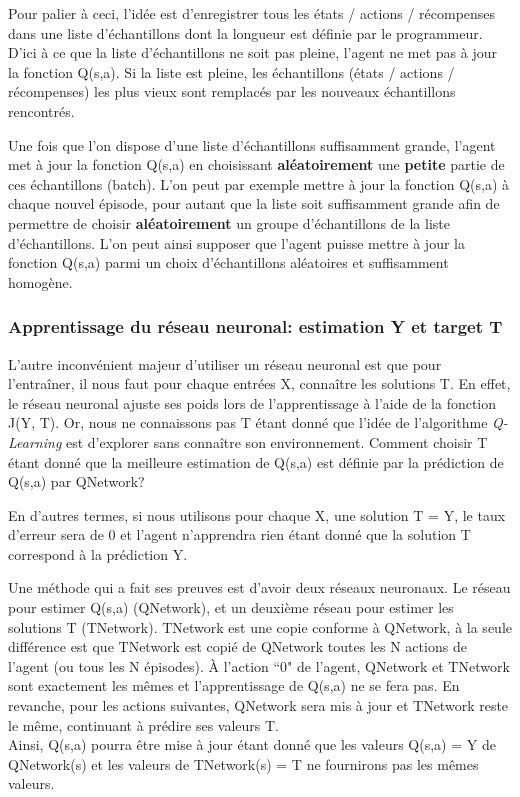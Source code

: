 \documentclass[11pt,a4paper]{report}
\begin{document}
  \par Pour palier à ceci, l'idée est d'enregistrer tous les états / actions / récompenses dans une liste d'échantillons dont la longueur est définie par le programmeur. D'ici à ce que la liste d'échantillons ne soit pas pleine, l'agent ne met pas à jour la fonction Q(s,a). Si la liste est pleine, les échantillons (états / actions / récompenses) les plus vieux sont remplacés par les nouveaux échantillons rencontrés. 
  
  \par Une fois que l'on dispose d'une liste d'échantillons suffisamment grande, l'agent met à jour la fonction Q(s,a) en choisissant \textbf{aléatoirement} une \textbf{petite} partie de ces échantillons (batch). L'on peut par exemple mettre à jour la fonction Q(s,a) à chaque nouvel épisode, pour autant que la liste soit suffisamment grande afin de permettre de choisir \textbf{aléatoirement} un groupe d'échantillons de la liste d'échantillons. L'on peut ainsi supposer que l'agent puisse mettre à jour la fonction Q(s,a) parmi un choix d'échantillons aléatoires et suffisamment homogène. 
  
  \subsubsection{Apprentissage du réseau neuronal: estimation Y et target T}
  
    \par L'autre inconvénient majeur d'utiliser un réseau neuronal est que pour l’entraîner, il nous faut pour chaque entrées X, connaître les solutions T. En effet, le réseau neuronal ajuste ses poids lors de l'apprentissage à l'aide de la fonction J(Y, T). Or, nous ne connaissons pas T étant donné que l'idée de l'algorithme \textit{Q-Learning} est d'explorer sans connaître son environnement. Comment choisir T étant donné que la meilleure estimation de Q(s,a) est définie par la prédiction de Q(s,a) par QNetwork? 
    
    \par En d'autres termes, si nous utilisons pour chaque X, une solution T = Y, le taux d'erreur sera de 0 et l'agent n'apprendra rien étant donné que la solution T correspond à la prédiction Y. 
    
    \par Une méthode qui a fait ses preuves est d'avoir deux réseaux neuronaux. Le réseau pour estimer Q(s,a) (QNetwork), et un deuxième réseau pour estimer les solutions T (TNetwork). TNetwork est une copie conforme à QNetwork, à la seule différence est que TNetwork est copié de QNetwork toutes les N actions de l'agent (ou tous les N épisodes). À l'action ``0" de l'agent, QNetwork et TNetwork sont exactement les mêmes et l'apprentissage de Q(s,a) ne se fera pas. En revanche, pour les actions suivantes, QNetwork sera mis à jour et TNetwork reste le même, continuant à prédire ses valeurs T. \\
    Ainsi, Q(s,a) pourra être mise à jour étant donné que les valeurs Q(s,a) = Y de QNetwork(s) et les valeurs de TNetwork(s) = T ne fournirons pas les mêmes valeurs. 
    
\end{document}
